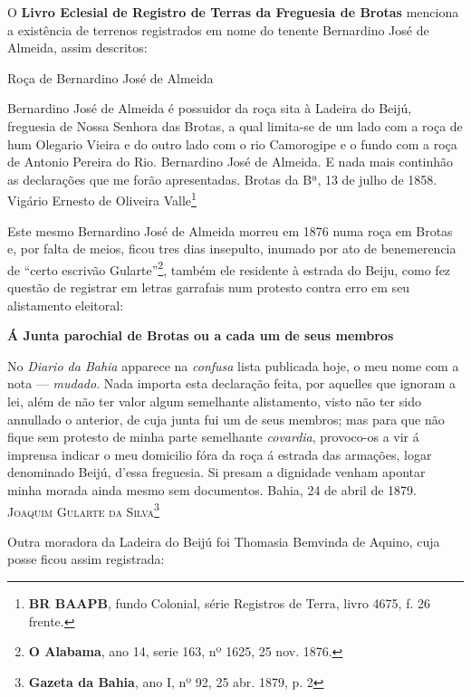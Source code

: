 O \textbf{Livro Eclesial de Registro de Terras da Freguesia de Brotas} menciona a existência de terrenos registrados em nome do tenente Bernardino José de Almeida, assim descritos:

\begin{citacao}
Roça de Bernardino José de Almeida

Bernardino José de Almeida é possuidor da roça sita à Ladeira do Beijú, freguesia de Nossa Senhora das Brotas, a qual limita-se de um lado com a roça de hum Olegario Vieira e do outro lado com o rio Camorogipe e o fundo com a roça de Antonio Pereira do Rio. Bernardino José de Almeida. E nada mais continhão as declarações que me forão apresentadas. Brotas da Bª, 13 de julho de 1858. Vigário Ernesto de Oliveira Valle\footnote{\textbf{BR BAAPB}, fundo Colonial, série Registros de Terra, livro 4675, f. 26 frente.}
\end{citacao}

Este mesmo Bernardino José de Almeida morreu em 1876 numa roça em Brotas e, por falta de meios, ficou tres dias insepulto, inumado por ato de benemerencia de ``certo escrivão Gularte''\footnote{\textbf{O Alabama}, ano 14, serie 163, nº 1625, 25 nov. 1876.}, também ele residente à estrada do Beiju, como fez questão de registrar em letras garrafais num protesto contra erro em seu alistamento eleitoral:

\begin{citacao}
\textbf{Á Junta parochial de Brotas ou a cada um de seus membros}

No \textit{Diario da Bahia} apparece na \textit{confusa} lista publicada hoje, o meu nome com a nota --- \textit{mudado}.
Nada importa esta declaração feita, por aquelles que ignoram a lei, além de não ter valor algum semelhante alistamento, visto não ter sido annullado o anterior, de cuja junta fui um de seus membros; mas para que não fique sem protesto de minha parte semelhante \textit{covardia}, provoco-os a vir á imprensa indicar o meu domicilio fóra da roça á estrada das armações, logar denominado Beijú, d'essa freguesia.
Si presam a dignidade venham apontar minha morada ainda mesmo sem documentos.
Bahia, 24 de abril de 1879.
\textsc{Joaquim Gularte da Silva}\footnote{\textbf{Gazeta da Bahia}, ano I, nº 92, 25 abr. 1879, p. 2}
\end{citacao}

Outra moradora da Ladeira do Beijú foi Thomasia Bemvinda de Aquino, cuja posse ficou assim registrada:

